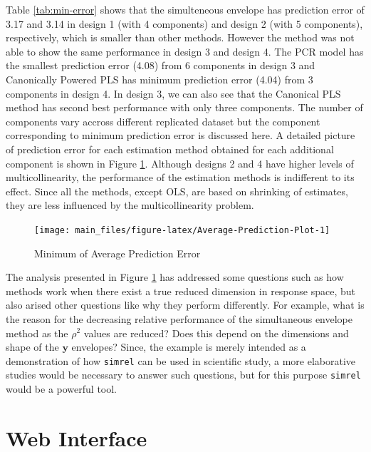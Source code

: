 \documentclass[3p,times,12pt,authoryear]{elsarticle}
\theoremstyle{definition}
\theoremstyle{definition}
\theoremstyle{remark}
\begin{document}

Table \ref{tab:min-error} shows that the simulteneous envelope has
prediction error of 3.17 and 3.14 in design 1 (with 4 components) and
design 2 (with 5 components), respectively, which is smaller than other
methods. However the method was not able to show the same performance in
design 3 and design 4. The PCR model has the smallest prediction error
(4.08) from 6 components in design 3 and Canonically Powered PLS has
minimum prediction error (4.04) from 3 components in design 4. In design
3, we can also see that the Canonical PLS method has second best
performance with only three components. The number of components vary
accross different replicated dataset but the component corresponding to
minimum prediction error is discussed here. A detailed picture of
prediction error for each estimation method obtained for each additional
component is shown in Figure \ref{fig:Average-Prediction-Plot}. Although
designs 2 and 4 have higher levels of multicollinearity, the performance
of the estimation methods is indifferent to its effect. Since all the
methods, except OLS, are based on shrinking of estimates, they are less
influenced by the multicollinearity problem.

\begin{figure}[!htb]
\texttt{[image: main\_files/figure-latex/Average-Prediction-Plot-1]} \caption{Minimum of Average Prediction Error}\label{fig:Average-Prediction-Plot}
\end{figure}

The analysis presented in Figure \ref{fig:Average-Prediction-Plot} has
addressed some questions such as how methods work when there exist a
true reduced dimension in response space, but also arised other
questions like why they perform differently. For example, what is the
reason for the decreasing relative performance of the simultaneous
envelope method as the \(\rho^2\) values are reduced? Does this depend
on the dimensions and shape of the \(\mathbf{y}\) envelopes? Since, the
example is merely intended as a demonstration of how \texttt{simrel} can
be used in scientific study, a more elaborative studies would be
necessary to answer such questions, but for this purpose \texttt{simrel}
would be a powerful tool.

\section{Web Interface}\label{web-interface}
\end{document}
